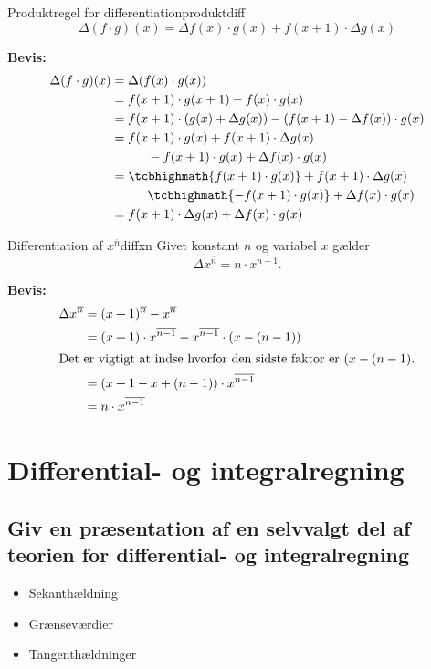 \documentclass{article}
\begin{document}
\begin{theorem}{Produktregel for differentiation}{produktdiff}
	\[
		\Delta (f \cdot g)(x) = \Delta f(x) \cdot g(x) + f(x + 1) \cdot \Delta g(x)
	\] 
\end{theorem}
\textbf{Bevis:}
\begin{align*}
	\Delta (f \cdot g)(x) &= \Delta (f(x) \cdot g(x))\\
						  &= f(x + 1) \cdot g(x + 1) - f(x) \cdot g(x)\\
						  &= f(x + 1) \cdot (g(x) + \Delta g(x)) - (f(x + 1) - \Delta f(x)) \cdot g(x)\\
						  &= f(x + 1) \cdot g(x) + f(x + 1) \cdot \Delta g(x) \\
						  &\gap- f(x + 1) \cdot g(x) + \Delta f(x) \cdot g(x)\\
						  &= \tcbhighmath{f(x + 1) \cdot g(x)} + f(x + 1) \cdot \Delta g(x) \\
						  &\gap\tcbhighmath{- f(x + 1) \cdot g(x)} + \Delta f(x) \cdot g(x)\\
						  &= f(x + 1) \cdot \Delta g(x) + \Delta f(x) \cdot g(x)
\end{align*}

\begin{theorem}{Differentiation af $x^{\overline{n}}$}{diffxn}
	Givet konstant $n$ og variabel $x$ gælder
	\[
		\Delta x^{\overline{n}} = n \cdot x^{\overline{n-1}}.
	\]
\end{theorem}
\textbf{Bevis:}
\begin{align*}
	\Delta x^{\overline{n}} &= (x+1)^{\overline{n}} - x^{\overline{n}}\\
	&= (x+1) \cdot x^{\overline{n-1}} - x^{\overline{n-1}} \cdot (x - (n-1))\\
\intertext{Det er vigtigt at indse hvorfor den sidste faktor er $(x - (n-1)$.}
	&= (x + 1 - x + (n - 1)) \cdot x^{\overline{n-1}}\\
	&= n \cdot x^{\overline{n-1}}
\end{align*}

\section{Differential- og integralregning}
\subsection{Giv en præsentation af en selvvalgt del af teorien for 
differential- og integralregning}
\begin{itemize}
	\item Sekanthældning
	\item Grænseværdier
	\item Tangenthældninger
\end{itemize}
\end{document}
